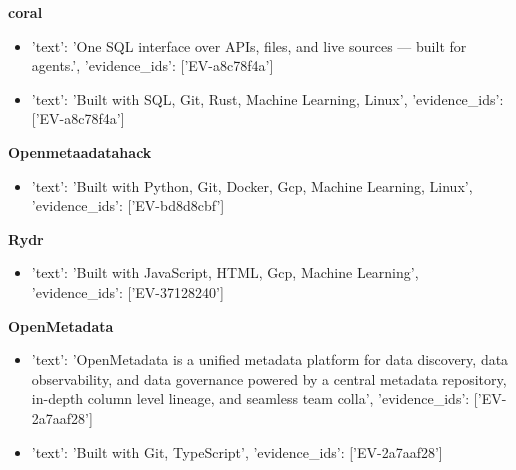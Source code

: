 \documentclass[10pt, letterpaper]{article}
\begin{document}
    \vspace{4pt}

    \textbf{\color{primary} coral}  \\
    
    
    \begin{itemize}
    
        \item {'text': 'One SQL interface over APIs, files, and live sources — built for agents.', 'evidence_ids': ['EV-a8c78f4a']}
    
        \item {'text': 'Built with SQL, Git, Rust, Machine Learning, Linux', 'evidence_ids': ['EV-a8c78f4a']}
    
    \end{itemize}
    
    \vspace{4pt}

    \textbf{\color{primary} Openmetaadatahack}  \\
    
    
    \begin{itemize}
    
        \item {'text': 'Built with Python, Git, Docker, Gcp, Machine Learning, Linux', 'evidence_ids': ['EV-bd8d8cbf']}
    
    \end{itemize}
    
    \vspace{4pt}

    \textbf{\color{primary} Rydr}  \\
    
    
    \begin{itemize}
    
        \item {'text': 'Built with JavaScript, HTML, Gcp, Machine Learning', 'evidence_ids': ['EV-37128240']}
    
    \end{itemize}
    
    \vspace{4pt}

    \textbf{\color{primary} OpenMetadata}  \\
    
    
    \begin{itemize}
    
        \item {'text': 'OpenMetadata is a unified metadata platform for data discovery, data observability, and data governance powered by a central metadata repository, in-depth column level lineage, and seamless team colla', 'evidence_ids': ['EV-2a7aaf28']}
    
        \item {'text': 'Built with Git, TypeScript', 'evidence_ids': ['EV-2a7aaf28']}
    
    \end{itemize}
    
\end{document}
